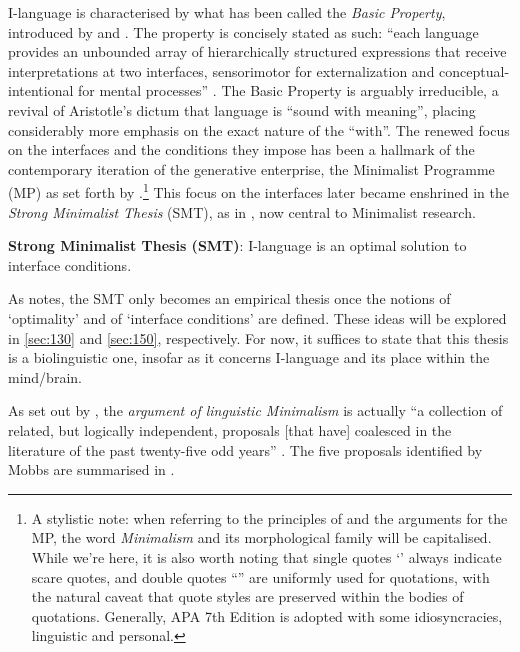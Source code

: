 I-language is characterised by what has been called the \textit{Basic Property}, introduced by \textcite[]{BerwickRC.ChomskyN_2016} and \textcite[4]{ChomskyN_2016}. The property is concisely stated as such: ``each language provides an unbounded array of hierarchically structured expressions that receive interpretations at two interfaces, sensorimotor for externalization and conceptual-intentional for mental processes'' \parencite[4]{ChomskyN_2016}. The Basic Property is arguably irreducible, a revival of Aristotle's dictum that language is ``sound with meaning'', placing considerably more emphasis on the exact nature of the ``with''. The renewed focus on the interfaces and the conditions they impose has been a hallmark of the contemporary iteration of the generative enterprise, the Minimalist Programme (MP) as set forth by \textcite{ChomskyN_1993}.\footnote{A stylistic note: when referring to the principles of and the arguments for the MP, the word \textit{Minimalism} and its morphological family will be capitalised. While we're here, it is also worth noting that single quotes `' always indicate scare quotes, and double quotes ``'' are uniformly used for quotations, with the natural caveat that quote styles are preserved within the bodies of quotations. Generally, APA 7th Edition \parencite{APA_2020} is adopted with some idiosyncracies, linguistic and personal.} This focus on the interfaces later became enshrined in the \textit{Strong Minimalist Thesis} (SMT), as in , now central to Minimalist research.

\begin{example}\label{ex:SMT}
    \textbf{Strong Minimalist Thesis (SMT)}: I-language is an optimal solution to interface conditions. \parencite[1]{ChomskyN_2001}
\end{example}

As \textcite{ChomskyN_2001} notes, the SMT only becomes an empirical thesis once the notions of `optimality' and of `interface conditions' are defined. These ideas will be explored in \autoref{sec:130} and \autoref{sec:150}, respectively. For now, it suffices to state that this thesis is a biolinguistic one, insofar as it concerns I-language and its place within the mind/brain.

As set out by \textcite{MobbsI_2015}, the \textit{argument of linguistic Minimalism} is actually ``a collection of related, but logically independent, proposals [that have] coalesced in the literature of the past twenty-five odd years'' \parencite[1]{MobbsI_2015}. The five proposals identified by Mobbs are summarised in .


